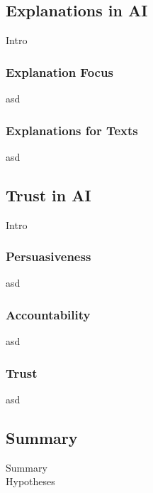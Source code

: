 \subsection{Explanations in AI}
Intro

\subsubsection{Explanation Focus}
asd

\subsubsection{Explanations for Texts}
asd



\subsection{Trust in AI}
Intro

\subsubsection{Persuasiveness}
asd

\subsubsection{Accountability}
asd

\subsubsection{Trust}
asd



\subsection{Summary}
Summary\\
Hypotheses
